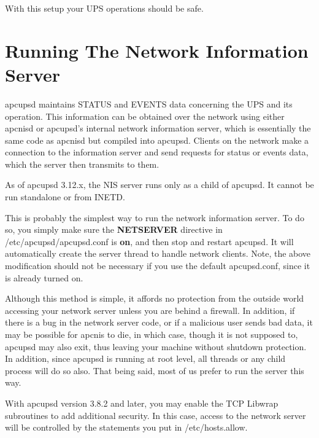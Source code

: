 {{{{{{{With this setup your UPS operations should be safe. 


\label{Running-The-Network-Information-Server}

\section*{Running The Network Information Server}

apcupsd maintains STATUS and EVENTS data concerning the UPS and its operation.
This information can be obtained over the network using either apcnisd or
apcupsd's internal network information server, which is essentially the same
code as apcnisd but compiled into apcupsd. Clients on the network make a
connection to the information server and send requests for status or events
data, which the server then transmits to them.  

As of apcupsd 3.12.x, the NIS server runs only as a child of apcupsd.
It cannot be run standalone or from INETD.

This is probably the simplest way to run the network information server. To do
so, you simply make sure the {\bf NETSERVER} directive in
/etc/apcupsd/apcupsd.conf is {\bf on}, and then stop and restart apcupsd. It
will automatically create the server thread to handle network clients. 
Note, the above modification should not be necessary if you use the default
apcupsd.conf, since it is already turned on.  

Although this method is simple, it affords no protection from the outside
world accessing your network server unless you are behind a firewall. In
addition, if there is a bug in the network server code, or if a malicious user
sends bad data, it may be possible for apcnis to die, in which case, though it
is not supposed to, apcupsd may also exit, thus leaving your machine without
shutdown protection. In addition, since apcupsd is running at root level, all
threads or any child process will do so also. That being said, most of us
prefer to run the server this way.  

With apcupsd version 3.8.2 and later, you may enable the TCP Libwrap
subroutines to add additional security. In this case, access to the network
server will be controlled by the statements you put in /etc/hosts.allow. 

\label{apcupsd-System-Logging}

}}}}}}}

